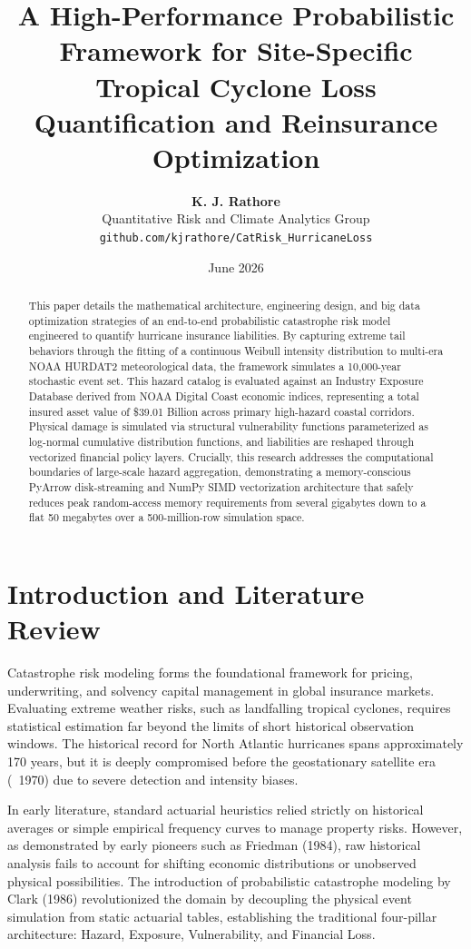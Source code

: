 \documentclass[11pt,article]{article}
\title{\textbf{A High-Performance Probabilistic Framework for Site-Specific Tropical Cyclone Loss Quantification and Reinsurance Optimization}}
\author{\textbf{K. J. Rathore} \\ Quantitative Risk and Climate Analytics Group \\ \texttt{github.com/kjrathore/CatRisk\_HurricaneLoss}}
\date{June 2026}
\begin{document}
\maketitle

\begin{abstract}
This paper details the mathematical architecture, engineering design, and big data optimization strategies of an end-to-end probabilistic catastrophe risk model engineered to quantify hurricane insurance liabilities. By capturing extreme tail behaviors through the fitting of a continuous Weibull intensity distribution to multi-era NOAA HURDAT2 meteorological data, the framework simulates a 10,000-year stochastic event set. This hazard catalog is evaluated against an Industry Exposure Database derived from NOAA Digital Coast economic indices, representing a total insured asset value of \$39.01 Billion across primary high-hazard coastal corridors. Physical damage is simulated via structural vulnerability functions parameterized as log-normal cumulative distribution functions, and liabilities are reshaped through vectorized financial policy layers. Crucially, this research addresses the computational boundaries of large-scale hazard aggregation, demonstrating a memory-conscious PyArrow disk-streaming and NumPy SIMD vectorization architecture that safely reduces peak random-access memory requirements from several gigabytes down to a flat 50 megabytes over a 500-million-row simulation space. 
\end{abstract}

\section{Introduction and Literature Review}
Catastrophe risk modeling forms the foundational framework for pricing, underwriting, and solvency capital management in global insurance markets. Evaluating extreme weather risks, such as landfalling tropical cyclones, requires statistical estimation far beyond the limits of short historical observation windows. The historical record for North Atlantic hurricanes spans approximately 170 years, but it is deeply compromised before the geostationary satellite era (~1970) due to severe detection and intensity biases.

In early literature, standard actuarial heuristics relied strictly on historical averages or simple empirical frequency curves to manage property risks. However, as demonstrated by early pioneers such as Friedman (1984), raw historical analysis fails to account for shifting economic distributions or unobserved physical possibilities. The introduction of probabilistic catastrophe modeling by Clark (1986) revolutionized the domain by decoupling the physical event simulation from static actuarial tables, establishing the traditional four-pillar architecture: Hazard, Exposure, Vulnerability, and Financial Loss.
\end{document}
